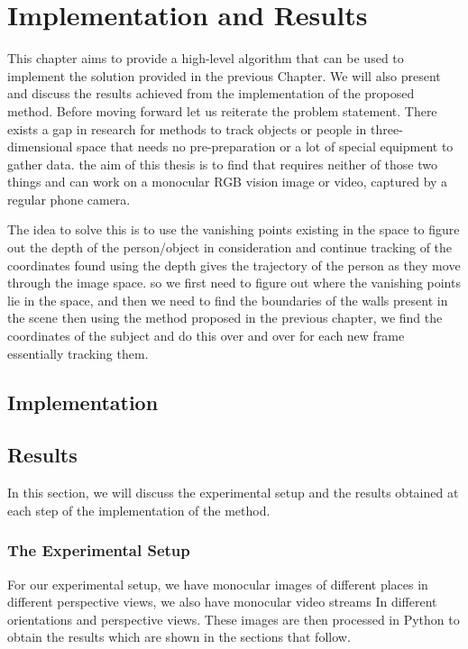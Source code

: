\chapter{Implementation and Results}

This chapter aims to provide a high-level algorithm that can be used to implement the solution provided in the previous Chapter. We will also present and discuss the results achieved from the implementation of the proposed method. Before moving forward let us reiterate the problem statement. There exists a gap in research for methods to track objects or people in three-dimensional space that needs no pre-preparation or a lot of special equipment to gather data. the aim of this thesis is to find that requires neither of those two things and can work on a monocular RGB vision image or video, captured by a regular phone camera.\newline

The idea to solve this is to use the vanishing points existing in the space to figure out the depth of the person/object in consideration and continue tracking of the coordinates found using the depth gives the trajectory of the person as they move through the image space. so we first need to figure out where the vanishing points lie in the space, and then we need to find the boundaries of the walls present in the scene then using the method proposed in the previous chapter, we find the coordinates of the subject and do this over and over for each new frame essentially tracking them.\newline

\section{Implementation}

\section{Results}

In this section, we will discuss the experimental setup and the results obtained at each step of the implementation of the method.\newline

\subsection{The Experimental Setup}

For our experimental setup, we have monocular images of different places in different perspective views, we also have monocular video streams In different orientations and perspective views. These images are then processed in Python to obtain the results which are shown in the sections that follow.\newline

